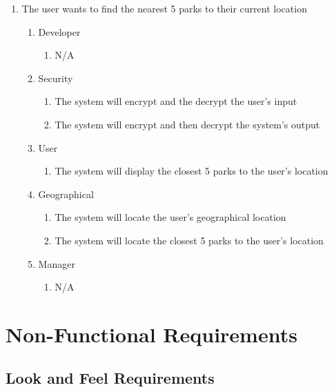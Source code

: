 \documentclass[titlepage]{article}
\begin{document}
\begin{enumerate}[{BE}1.]
    \item The user wants to find the nearest 5 parks to their current location
    \begin{enumerate}[{VP\theenumi}.1]
        \item Developer
            \begin{enumerate}
                \item N/A
            \end{enumerate}
        \item Security
            \begin{enumerate}
                \item The system will encrypt and the decrypt the user's input
                \item The system will encrypt and then decrypt the system's output
            \end{enumerate}
        \item User
            \begin{enumerate}
                \item The system will display the closest 5 parks to the user's location
            \end{enumerate}
        \item Geographical
            \begin{enumerate}
                \item The system will locate the user's geographical location
                \item The system will locate the closest 5 parks to the user's location
            \end{enumerate}
        \item Manager
            \begin{enumerate}
                \item N/A
            \end{enumerate}
    \end{enumerate}


\end{enumerate}

\section{Non-Functional Requirements}
\label{sec:non-functional_requirements}
\subsection{Look and Feel Requirements}
\label{sub:look_and_feel_requirements}
\end{document}

